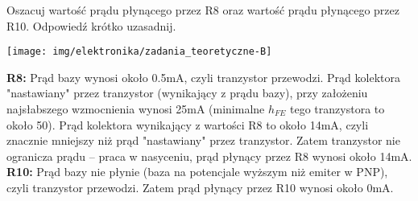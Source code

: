 % 
% 
% 
% 





%
%

\dbEntryCheckResults
Oszacuj wartość prądu płynącego przez R8 oraz wartość prądu płynącego przez R10. Odpowiedź krótko uzasadnij.
	\begin{center}
		\texttt{[image: img/elektronika/zadania\_teoretyczne-B]}
	\end{center}
\fi
{}\dbEntryCheckResults
\textbf{R8:} Prąd bazy wynosi około 0.5mA, czyli tranzystor przewodzi.
             Prąd kolektora "nastawiany" przez tranzystor (wynikający z prądu bazy), przy założeniu najsłabszego wzmocnienia wynosi 25mA (minimalne $h_{FE}$ tego tranzystora to około 50).
             Prąd kolektora wynikający z wartości R8 to około 14mA, czyli znacznie mniejszy niż prąd "nastawiany" przez tranzystor.
             Zatem tranzystor nie ogranicza prądu – praca w nasyceniu, prąd płynący przez R8 wynosi około 14mA.\\
\textbf{R10:} Prąd bazy nie płynie (baza na potencjale wyższym niż emiter w PNP), czyli tranzystor przewodzi.
              Zatem prąd płynący przez R10 wynosi około 0mA.
\fi

